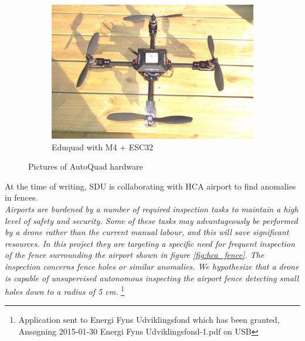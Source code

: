 \begin{figure}[H]
\begin{subfigure}[b]{0.3\textwidth}
        \includegraphics[width=\textwidth]{graphics/eduquad.jpg}
        \caption{Eduquad with M4 + ESC32}
        \label{fig:mouse}
    \end{subfigure}
    \caption{Pictures of AutoQuad hardware}\label{fig:AQ_hw}
\end{figure} 

At the time of writing, SDU is collaborating with HCA airport to find anomalies in fences.\\ 
\textit{Airports are burdened by a number of required inspection tasks to maintain a high level of 
safety and security.
Some of these tasks may advantageously be performed by a drone rather than the current manual labour, and this will save significant resources.
In this project they are targeting a specific need for frequent inspection of the fence surrounding the airport shown in figure \ref{fig:hca_fence}. 
The inspection concerns fence holes or similar anomalies. We hypothesize that a drone is 
capable of unsupervised autonomous inspecting the airport fence detecting small holes down 
to a radius of 5 cm.} \footnote{Application sent to Energi Fyns Udviklingsfond which has been granted, Ansøgning 2015-01-30 Energi Fyns Udviklingsfond-1.pdf on USB}

